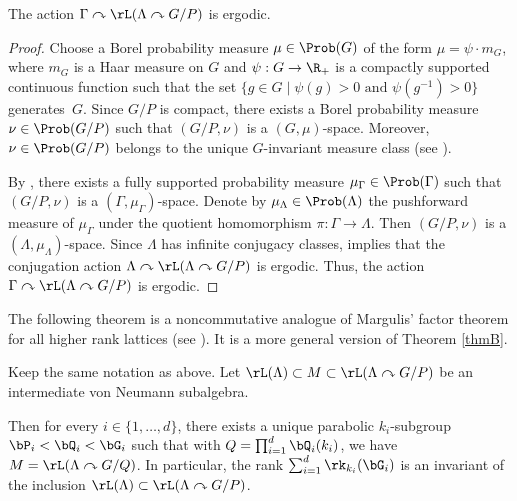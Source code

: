 \begin{lem}\label{lem-conjugation}
The action $\Gamma \curvearrowright \rL(\Lambda \curvearrowright G/P)$ is ergodic.
\end{lem}

\begin{proof}
Choose a Borel probability measure $\mu \in \Prob(G)$ of the form $\mu = \psi \cdot m_G$, where $m_G$ is a Haar measure on $G$ and $\psi : G \to \R_+$ is a compactly supported continuous function such that the set $\{g \in G \mid \psi(g) > 0 \text{ and } \psi(g^{-1}) > 0\}$ generates~$G$. Since $G/P$ is compact, there exists a Borel probability measure $\nu \in \Prob(G/P)$ such that $(G/P, \nu)$ is a $(G, \mu)$-space. Moreover, $\nu\in \Prob(G/P)$ belongs to the unique $G$-invariant measure class (see \eg \cite[Lem.\,1.1]{NZ97}).

By \cite[Prop.\,VI.4.1]{Ma91}, there exists a fully supported probability measure $\mu_\Gamma \in \Prob(\Gamma)$ such that $(G/P, \nu)$ is a $(\Gamma, \mu_\Gamma)$-space. Denote by $\mu_\Lambda \in \Prob(\Lambda)$ the pushforward measure of $\mu_\Gamma$ under the quotient homomorphism $\pi : \Gamma \to \Lambda$. Then $(G/P, \nu)$ is a $(\Lambda, \mu_\Lambda)$-space. Since $\Lambda$ has infinite conjugacy classes, \cite[Lem.\,2.6]{KP21} implies that the conjugation action $\Lambda \curvearrowright \rL(\Lambda \curvearrowright G/P)$ is ergodic. Thus, the action $\Gamma \curvearrowright \rL(\Lambda \curvearrowright G/P)$ is ergodic.
\end{proof}

The following theorem is a noncommutative analogue of Margulis'\! factor theorem for all higher rank lattices (see \cite[Th.\,IV.2.11]{Ma91}). It is a more general version of Theorem \ref{thmB}.

\begin{thm}\label{thm-higher-rank}
Keep the same notation as above. Let $\rL(\Lambda) \subset M \subset \rL(\Lambda \curvearrowright G/P)$ be an intermediate von Neumann subalgebra.

Then for every $i \in \{1, \dots, d\}$, there exists a unique parabolic $k_i$-subgroup $\bP_i < \bQ_i < \bG_i$ such that with $Q = \prod_{i = 1}^d \bQ_i(k_i)$, we have $M = \rL(\Lambda \curvearrowright G/Q)$. In particular, the rank $\sum_{i = 1}^d \rk_{k_i}(\bG_i)$ is an invariant of the inclusion $\rL(\Lambda) \subset \rL(\Lambda \curvearrowright G/P)$.
\end{thm}

